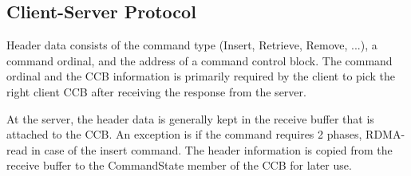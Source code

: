 \subsection{Client-Server Protocol}

Header data consists of the command type (Insert, Retrieve, Remove,
...), a command ordinal, and the address of a command control block.
The command ordinal and the CCB information is primarily required by
the client to pick the right client CCB after receiving the response
from the server.


At the server, the header data is generally kept in the receive buffer
that is attached to the CCB.  An exception is if the command requires
2 phases, \abrIE RDMA-read in case of the insert command.  The
header information is copied from the receive buffer to the
CommandState member of the CCB for later use.




\endinput



